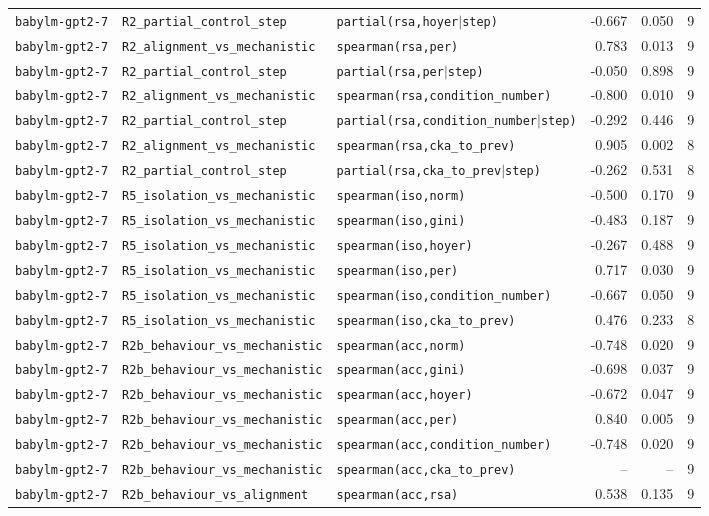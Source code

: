 \begin{longtable}{lllrrr}
\texttt{babylm-gpt2-7} & \texttt{R2\_partial\_control\_step} & \texttt{partial(rsa,hoyer$\mid$step)} & -0.667 & 0.050 & 9 \\
\texttt{babylm-gpt2-7} & \texttt{R2\_alignment\_vs\_mechanistic} & \texttt{spearman(rsa,per)} & 0.783 & 0.013 & 9 \\
\texttt{babylm-gpt2-7} & \texttt{R2\_partial\_control\_step} & \texttt{partial(rsa,per$\mid$step)} & -0.050 & 0.898 & 9 \\
\texttt{babylm-gpt2-7} & \texttt{R2\_alignment\_vs\_mechanistic} & \texttt{spearman(rsa,condition\_number)} & -0.800 & 0.010 & 9 \\
\texttt{babylm-gpt2-7} & \texttt{R2\_partial\_control\_step} & \texttt{partial(rsa,condition\_number$\mid$step)} & -0.292 & 0.446 & 9 \\
\texttt{babylm-gpt2-7} & \texttt{R2\_alignment\_vs\_mechanistic} & \texttt{spearman(rsa,cka\_to\_prev)} & 0.905 & 0.002 & 8 \\
\texttt{babylm-gpt2-7} & \texttt{R2\_partial\_control\_step} & \texttt{partial(rsa,cka\_to\_prev$\mid$step)} & -0.262 & 0.531 & 8 \\
\texttt{babylm-gpt2-7} & \texttt{R5\_isolation\_vs\_mechanistic} & \texttt{spearman(iso,norm)} & -0.500 & 0.170 & 9 \\
\texttt{babylm-gpt2-7} & \texttt{R5\_isolation\_vs\_mechanistic} & \texttt{spearman(iso,gini)} & -0.483 & 0.187 & 9 \\
\texttt{babylm-gpt2-7} & \texttt{R5\_isolation\_vs\_mechanistic} & \texttt{spearman(iso,hoyer)} & -0.267 & 0.488 & 9 \\
\texttt{babylm-gpt2-7} & \texttt{R5\_isolation\_vs\_mechanistic} & \texttt{spearman(iso,per)} & 0.717 & 0.030 & 9 \\
\texttt{babylm-gpt2-7} & \texttt{R5\_isolation\_vs\_mechanistic} & \texttt{spearman(iso,condition\_number)} & -0.667 & 0.050 & 9 \\
\texttt{babylm-gpt2-7} & \texttt{R5\_isolation\_vs\_mechanistic} & \texttt{spearman(iso,cka\_to\_prev)} & 0.476 & 0.233 & 8 \\
\texttt{babylm-gpt2-7} & \texttt{R2b\_behaviour\_vs\_mechanistic} & \texttt{spearman(acc,norm)} & -0.748 & 0.020 & 9 \\
\texttt{babylm-gpt2-7} & \texttt{R2b\_behaviour\_vs\_mechanistic} & \texttt{spearman(acc,gini)} & -0.698 & 0.037 & 9 \\
\texttt{babylm-gpt2-7} & \texttt{R2b\_behaviour\_vs\_mechanistic} & \texttt{spearman(acc,hoyer)} & -0.672 & 0.047 & 9 \\
\texttt{babylm-gpt2-7} & \texttt{R2b\_behaviour\_vs\_mechanistic} & \texttt{spearman(acc,per)} & 0.840 & 0.005 & 9 \\
\texttt{babylm-gpt2-7} & \texttt{R2b\_behaviour\_vs\_mechanistic} & \texttt{spearman(acc,condition\_number)} & -0.748 & 0.020 & 9 \\
\texttt{babylm-gpt2-7} & \texttt{R2b\_behaviour\_vs\_mechanistic} & \texttt{spearman(acc,cka\_to\_prev)} & -- & -- & 9 \\
\texttt{babylm-gpt2-7} & \texttt{R2b\_behaviour\_vs\_alignment} & \texttt{spearman(acc,rsa)} & 0.538 & 0.135 & 9 \\
\end{longtable}
